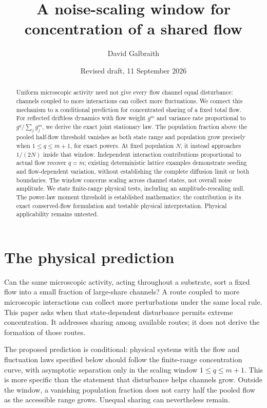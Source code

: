 \documentclass[11pt,a4paper]{article}
\title{A noise-scaling window for concentration of a shared flow}
\author{David Galbraith}
\date{Revised draft, 11 September 2026}
\begin{document}
\maketitle
\begin{abstract}
Uniform microscopic activity need not give every flow channel equal disturbance:
channels coupled to more interactions can collect more fluctuations. We connect this mechanism
to a conditional prediction for concentrated sharing of a fixed total flow.
For reflected driftless dynamics with flow weight $g^m$ and variance rate
proportional to $g^q/\sum_jg_j^m$, we derive the exact joint stationary law.
The population fraction above the pooled half-flow threshold vanishes as both
state range and population grow precisely when $1\le q\le m+1$, for exact powers.
At fixed population $N$, it instead approaches $1/(2N)$ inside that window.
Independent interaction contributions proportional to actual flow recover $q=m$;
existing deterministic lattice examples demonstrate seeding and flow-dependent
variation, without establishing the complete diffusion limit or both boundaries.
The window concerns scaling across channel states, not overall noise amplitude.
We state finite-range physical tests, including an amplitude-rescaling null.
The power-law moment threshold is established mathematics; the contribution is
its exact conserved-flow formulation and testable physical interpretation.
Physical applicability remains untested.
\end{abstract}

\section{The physical prediction}

Can the same microscopic activity, acting throughout a substrate, sort a fixed
flow into a small fraction of large-share channels? A route coupled to more
microscopic interactions can collect more perturbations under the same local rule. This paper asks
when that state-dependent disturbance permits extreme concentration. It addresses
sharing among available routes; it does not derive the formation of those routes.

The proposed prediction is conditional: physical systems with the flow and
fluctuation laws specified below should follow the finite-range concentration
curve, with asymptotic separation only in the scaling window $1\le q\le m+1$.
This is more specific than the statement that disturbance helps channels grow.
Outside the window, a vanishing population fraction does not carry half the pooled
flow as the accessible range grows. Unequal sharing can nevertheless remain.
\end{document}
